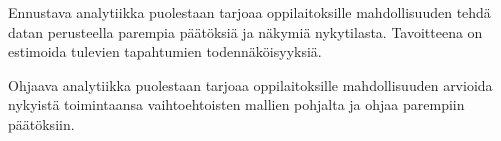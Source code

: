 Ennustava analytiikka puolestaan tarjoaa oppilaitoksille mahdollisuuden tehdä datan perusteella parempia päätöksiä ja näkymiä nykytilasta. Tavoitteena on estimoida tulevien tapahtumien todennäköisyyksiä.

Ohjaava analytiikka puolestaan tarjoaa oppilaitoksille mahdollisuuden arvioida nykyistä toimintaansa vaihtoehtoisten mallien pohjalta ja ohjaa parempiin päätöksiin.
\color{black}